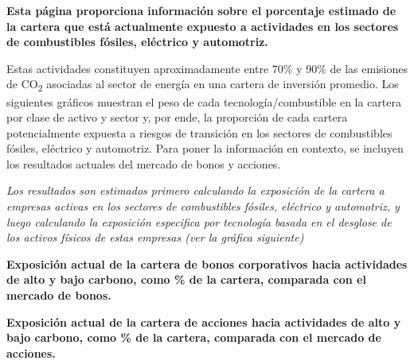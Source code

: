 \documentclass[10pt,table]{article}\usepackage[]{graphicx}\usepackage[]{color}
\begin{document}
	\begin{multicols}{2}
		
		\textbf{Esta página proporciona información sobre el porcentaje estimado de la cartera que está actualmente expuesto a actividades en los sectores de combustibles fósiles, eléctrico y automotriz.}
		
		Estas actividades constituyen aproximadamente entre 70\% y 90\% de las emisiones de CO\textsubscript{2} asociadas al sector de energía en una cartera de inversión promedio. Los siguientes gráficos muestran el peso de cada tecnología/combustible en la cartera por clase de activo y sector y, por ende, la proporción de cada cartera potencialmente expuesta a riesgos de transición en los sectores de combustibles fósiles, eléctrico y automotriz. Para poner la información en contexto, se incluyen los resultados actuales del mercado de bonos y acciones.
		
		
		\textit{Los resultados son estimados primero calculando la exposición de la cartera a empresas activas en los sectores de combustibles fósiles, eléctrico y automotriz, y luego calculando la exposición especifica por tecnología basada en el desglose de los activos físicos de estas empresas (ver la gráfica siguiente) }
		
		\vspace{-0.1cm}
		
	\end{multicols}
	
	\vspace{-0.7cm}
	
	\textbf{Exposición actual de la cartera de bonos corporativos hacia actividades de alto y bajo carbono, como \% de la cartera, comparada con el mercado de bonos.} 
	
	\vspace{-0.2cm}
	
	
	\textbf{Exposición actual de la cartera de acciones hacia actividades de alto y bajo carbono, como \% de la cartera, comparada con el mercado de acciones.} 
	
	\vspace{-0.2cm}
	
	
\end{document}
